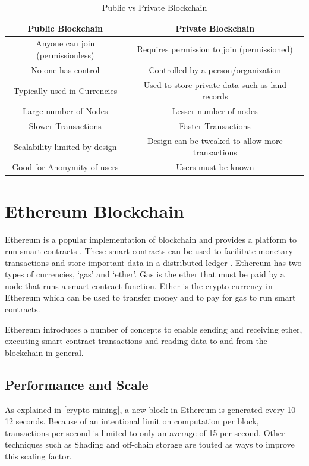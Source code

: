 \documentclass[11pt,openright]{report}
\begin{document}
\begin{table}[!htbp]
	\renewcommand{\arraystretch}{1.3}
	\caption{Public vs Private Blockchain}
	\label{pub_priv_blockchains}
	\centering
	\begin{tabular}{|c|c|}
		\hline
		\bfseries Public Blockchain & \bfseries Private Blockchain \\
		\hline\hline
		Anyone can join (permissionless) & Requires permission to join (permissioned) \\ \hline
	    No one has control & Controlled by a person/organization \\ \hline
        Typically used in Currencies & Used to store private data such as land records \\ \hline
        Large number of Nodes & Lesser number of nodes \\ \hline
        Slower Transactions  & Faster Transactions \\ \hline
        Scalability limited by design  & Design can be tweaked to allow more transactions \\ \hline
        Good for Anonymity of users  & Users must be known \\ \hline
	\end{tabular}
\end{table}


\section{Ethereum Blockchain}
Ethereum is a popular implementation of blockchain and provides a platform to run smart contracts \cite{buterin2013whitepaper}. These smart contracts can be used to facilitate monetary transactions and store important data in a distributed ledger \cite{egbertsen2016replacing}. Ethereum has two types of currencies, ‘gas’ and ‘ether’. Gas is the ether that must be paid by a node that runs a smart contract function. Ether is the crypto-currency in Ethereum which can be used to transfer money and to pay for gas to run smart contracts.

Ethereum introduces a number of concepts to enable sending and receiving ether, executing smart contract transactions and reading data to and from the blockchain in general.



\subsection{Performance and Scale}
As explained in \ref{crypto-mining}, a new block in Ethereum is generated every 10 - 12 seconds. Because of an intentional limit on computation per block, transactions per second is limited to only an average of 15 per second. Other techniques such as Shading and off-chain storage are touted as ways to improve this scaling factor. 
\end{document}
